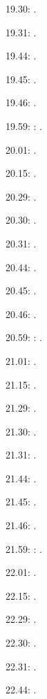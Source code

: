 \documentclass[italian]{article}
\begin{document}
19.30:     .

19.31:     .

19.44:     .

19.45:     .

19.46:     .

19.59:     
:    .

20.01:     . 

20.15:     . 

20.29:     . 

20.30:     .

20.31:     .

20.44:     .

20.45:     .

20.46:     .

20.59:     
:    .

21.01:     . 

21.15:     . 

21.29:     . 

21.30:     .

21.31:     .

21.44:     .

21.45:     .

21.46:     .

21.59:     
:    .

22.01:     . 

22.15:     . 

22.29:     . 

22.30:     .

22.31:     .

22.44:     .
\end{document}
